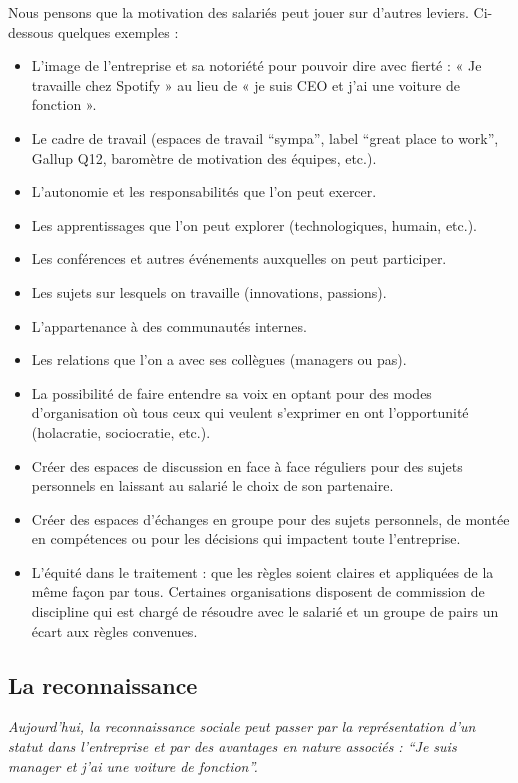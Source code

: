 \documentclass[12pt]{article}
\newcommand{\actuel}[1]{%
  \begin{tcolorbox}[colframe=DarkButter,boxrule=2pt,arc=4pt,left=6pt,right=6pt,top=6pt,bottom=6pt,boxsep=0pt,colback=Aluminium2]
    \textit{#1}
  \end{tcolorbox}
}
\begin{document}
 Nous pensons que la motivation des salariés peut jouer sur d’autres leviers. Ci-dessous quelques exemples :
 \begin{itemize}
   \item L’image de l’entreprise et sa notoriété pour pouvoir dire avec fierté : « Je travaille chez Spotify » au lieu de « je suis CEO et j’ai une voiture de fonction ».
   \item Le cadre de travail (espaces de travail “sympa”, label “great place to work”, Gallup Q12, baromètre de motivation des équipes, etc.).
   \item L’autonomie et les responsabilités que l’on peut exercer.
   \item Les apprentissages que l’on peut explorer (technologiques, humain, etc.).
   \item Les conférences et autres événements auxquelles on peut participer.
   \item Les sujets sur lesquels on travaille (innovations, passions).
   \item L’appartenance à des communautés internes.
   \item Les relations que l’on a avec ses collègues (managers ou pas).
   \item La possibilité de faire entendre sa voix en optant pour des modes d’organisation où tous ceux qui veulent s’exprimer en ont l’opportunité (holacratie, sociocratie, etc.).
   \item Créer des espaces de discussion en face à face réguliers pour des sujets personnels en laissant au salarié le choix de son partenaire.
   \item Créer des espaces d’échanges en groupe pour des sujets personnels, de montée en compétences ou pour les décisions qui impactent toute l’entreprise.
   \item L’équité dans le traitement : que les règles soient claires et appliquées de la même façon par tous. Certaines organisations disposent de commission de discipline qui est chargé de résoudre avec le salarié et un groupe de pairs un écart aux règles convenues.
 \end{itemize}

\subsection{La reconnaissance}
 \actuel{Aujourd’hui, la reconnaissance sociale peut passer par la représentation d’un statut dans l’entreprise et par des avantages en nature associés : “Je suis manager et j’ai une voiture de fonction”.}
\end{document}
